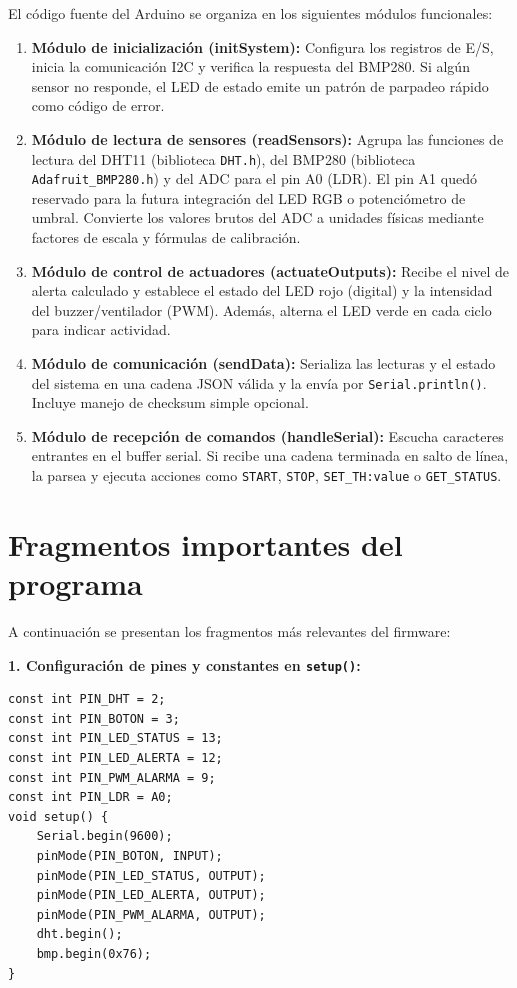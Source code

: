 El código fuente del Arduino se organiza en los siguientes módulos funcionales:

\begin{enumerate}[leftmargin=*]
    \item \textbf{Módulo de inicialización (initSystem):} Configura los registros de E/S, inicia la comunicación I2C y verifica la respuesta del BMP280. Si algún sensor no responde, el LED de estado emite un patrón de parpadeo rápido como código de error.
    
    \item \textbf{Módulo de lectura de sensores (readSensors):} Agrupa las funciones de lectura del DHT11 (biblioteca \texttt{DHT.h}), del BMP280 (biblioteca \texttt{Adafruit\_BMP280.h}) y del ADC para el pin A0 (LDR). El pin A1 quedó reservado para la futura integración del LED RGB o potenciómetro de umbral. Convierte los valores brutos del ADC a unidades físicas mediante factores de escala y fórmulas de calibración.
    
    \item \textbf{Módulo de control de actuadores (actuateOutputs):} Recibe el nivel de alerta calculado y establece el estado del LED rojo (digital) y la intensidad del buzzer/ventilador (PWM). Además, alterna el LED verde en cada ciclo para indicar actividad.
    
    \item \textbf{Módulo de comunicación (sendData):} Serializa las lecturas y el estado del sistema en una cadena JSON válida y la envía por \texttt{Serial.println()}. Incluye manejo de checksum simple opcional.
    
    \item \textbf{Módulo de recepción de comandos (handleSerial):} Escucha caracteres entrantes en el buffer serial. Si recibe una cadena terminada en salto de línea, la parsea y ejecuta acciones como \texttt{START}, \texttt{STOP}, \texttt{SET\_TH:value} o \texttt{GET\_STATUS}.
\end{enumerate}

\section{Fragmentos importantes del programa}

A continuación se presentan los fragmentos más relevantes del firmware:

\textbf{1. Configuración de pines y constantes en \texttt{setup()}:}

\begin{verbatim}
const int PIN_DHT = 2;
const int PIN_BOTON = 3;
const int PIN_LED_STATUS = 13;
const int PIN_LED_ALERTA = 12;
const int PIN_PWM_ALARMA = 9;
const int PIN_LDR = A0;
void setup() {
    Serial.begin(9600);
    pinMode(PIN_BOTON, INPUT);
    pinMode(PIN_LED_STATUS, OUTPUT);
    pinMode(PIN_LED_ALERTA, OUTPUT);
    pinMode(PIN_PWM_ALARMA, OUTPUT);
    dht.begin();
    bmp.begin(0x76);
}
\end{verbatim}

